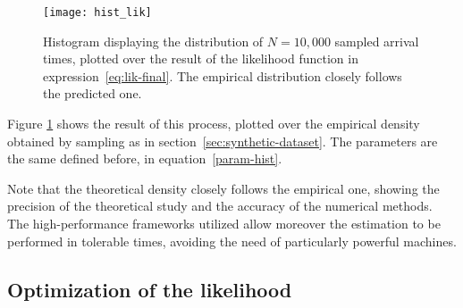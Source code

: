 \begin{figure}
  \centering
  \texttt{[image: hist\_lik]}
  \caption{Histogram displaying the distribution of \(N=10,000\) sampled arrival times,
    plotted over the result of the likelihood function in expression~\eqref{eq:lik-final}.
  The empirical distribution closely follows the predicted one.}
  \label{fig:hist-lik}
\end{figure}

Figure \ref{fig:hist-lik} shows the result of this process,
plotted over the empirical density obtained by sampling as in section~\ref{sec:synthetic-dataset}.
The parameters are the same defined before, in equation~\eqref{param-hist}.

Note that the theoretical density closely follows the empirical one,
showing the precision of the theoretical study and the accuracy of the numerical methods.
The high-performance frameworks utilized allow moreover the estimation to be performed in tolerable times,
avoiding the need of particularly powerful machines.

\subsection{Optimization of the likelihood}



